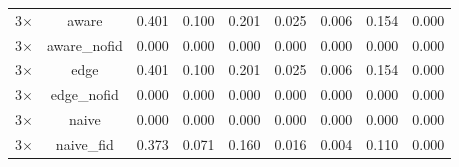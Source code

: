 \begin{table}
\begin{tabular}{lcccccccc}
3$\times$ & aware & 0.401 & 0.100 & 0.201 & 0.025 & 0.006 & 0.154 & 0.000 \\
3$\times$ & aware\_nofid & 0.000 & 0.000 & 0.000 & 0.000 & 0.000 & 0.000 & 0.000 \\
3$\times$ & edge & 0.401 & 0.100 & 0.201 & 0.025 & 0.006 & 0.154 & 0.000 \\
3$\times$ & edge\_nofid & 0.000 & 0.000 & 0.000 & 0.000 & 0.000 & 0.000 & 0.000 \\
3$\times$ & naive & 0.000 & 0.000 & 0.000 & 0.000 & 0.000 & 0.000 & 0.000 \\
3$\times$ & naive\_fid & 0.373 & 0.071 & 0.160 & 0.016 & 0.004 & 0.110 & 0.000 \\
\bottomrule
\end{tabular}
\par\vspace{2pt}{\footnotesize\raggedright The family is monotone and normalised; only its curvature changes. The policy ordering is read down the columns, not across them.\par}
\end{table}
